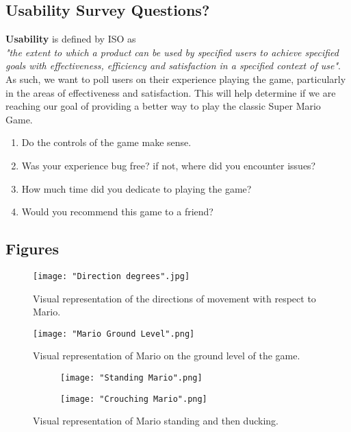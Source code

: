 \documentclass[12pt, titlepage]{article}
\begin{document}
\subsection{Usability Survey Questions?}

\textbf{Usability} is defined by ISO as\\

\emph{"the extent to which a product can be used by specified users to achieve specified goals with effectiveness, efficiency and satisfaction in a specified context of use"}.\\

As such, we want to poll users on their experience playing the game, particularly in the areas of effectiveness and satisfaction. This will help determine if we are reaching our goal of providing a better way to play the classic Super Mario Game.

\begin{enumerate}
    \item Do the controls of the game make sense.
    \item Was your experience bug free? if not, where did you encounter issues?
    \item How much time did you dedicate to playing the game?
    \item Would you recommend this game to a friend?
\end{enumerate}

\subsection{Figures}
\begin{figure}[!h]
    \centering
    \texttt{[image: "Direction degrees".jpg]}
    \caption{Visual representation of the directions of movement with respect to Mario.}
\end{figure}

\begin{figure}[!h]
    \centering
    \texttt{[image: "Mario Ground Level".png]}
    \caption{Visual representation of Mario on the ground level of the game.}
\end{figure}

\begin{figure}[!h]
    \begin{subfigure}{0.25\textwidth}
        \texttt{[image: "Standing Mario".png]}
    \end{subfigure}
    \hfill
    \begin{subfigure}{0.25\textwidth}
        \texttt{[image: "Crouching Mario".png]}
    \end{subfigure}
    \caption{Visual representation of Mario standing and then ducking.}
\end{figure}
\end{document}
